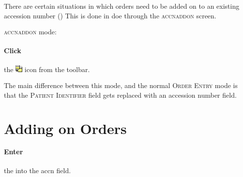 
There are certain situations in which orders need to be added on to an existing accession number () This is done in \gls{doe} through the \textsc{\gls{accnaddon}} screen.

 \textsc{\gls{accnaddon}} mode:

\paragraph{Click} the \includegraphics[height=1em]{graphics/accession_addon_icon.png} icon from the toolbar.\\



The main difference between this mode, and the normal \textsc{Order Entry} mode is that the \textsc{Patient Identifier} field gets replaced with an accession number field.\\

\noindent
{}

\section{Adding on Orders}

\paragraph{Enter} the \textsc{} into the \gls{accn} field.\accntip\\


